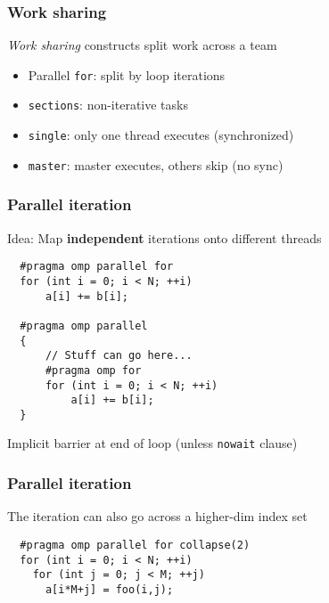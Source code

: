 \documentclass{beamer}
\begin{document}
\begin{frame}
  \frametitle{Work sharing}

  {\em Work sharing} constructs split work across a team
  \begin{itemize}
  \item Parallel {\tt for}: split by loop iterations
  \item {\tt sections}: non-iterative tasks
  \item {\tt single}: only one thread executes (synchronized)
  \item {\tt master}: master executes, others skip (no sync)
  \end{itemize}
\end{frame}


\begin{frame}[fragile]
  \frametitle{Parallel iteration}

  Idea: Map {\bf independent} iterations onto different threads
\begin{lstlisting}
  #pragma omp parallel for
  for (int i = 0; i < N; ++i)
      a[i] += b[i];

  #pragma omp parallel
  {
      // Stuff can go here...
      #pragma omp for    
      for (int i = 0; i < N; ++i)
          a[i] += b[i];
  }
\end{lstlisting}
  Implicit barrier at end of loop (unless {\tt nowait} clause)
\end{frame}


\begin{frame}[fragile]
  \frametitle{Parallel iteration}

  The iteration can also go across a higher-dim index set
\begin{lstlisting}
  #pragma omp parallel for collapse(2)    
  for (int i = 0; i < N; ++i)
    for (int j = 0; j < M; ++j)
      a[i*M+j] = foo(i,j);
\end{lstlisting}
\end{frame}
\end{document}
